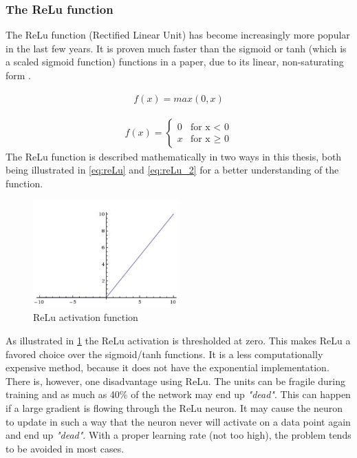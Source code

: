 \documentclass[USenglish]{ifimaster}  %
\begin{document}
\subsubsection{The ReLu function}
The ReLu function (Rectified Linear Unit) has become increasingly more popular in the last few years. It is proven much faster than the sigmoid or tanh (which is a scaled sigmoid function) functions in a paper, due to its linear, non-saturating form \cite{website:relu}. 

\begin{equation}\label{eq:reLu}
\begin{aligned}
f(x) = max(0,x)
\end{aligned}
\end{equation}

\begin{equation}\label{eq:reLu_2}
\begin{aligned}
{f(x) = 
\begin{cases}
    0 & \text{for x < 0}  \\
    x & \text{for x $\geq$ 0}
\end{cases}}
\end{aligned}
\end{equation}
The ReLu function is described mathematically in two ways in this thesis, both being illustrated in \cref{eq:reLu} and \cref{eq:reLu_2} for a better understanding of the function.

\begin{figure}[ht]
    \centering
    \includegraphics[width=0.5\textwidth]{bilder/relu_activation.png}
    \caption{ReLu activation function \cite{website:cs231n_activation_functions}}
    \label{fig:relu}
\end{figure}
As illustrated in \cref{fig:relu} the ReLu activation is thresholded at zero. This makes ReLu a favored choice over the sigmoid/tanh functions. It is a less computationally expensive method, because it does not have the exponential implementation. There is, however, one disadvantage using ReLu. The units can be fragile during training and as much as 40\% of the network may end up \textit{"dead"}. This can happen if a large gradient is flowing through the ReLu neuron. It may cause the neuron to update in such a way that the neuron never will activate on a data point again and end up \textit{"dead"}. With a proper learning rate (not too high), the problem tends to be avoided in most cases.
\end{document}
